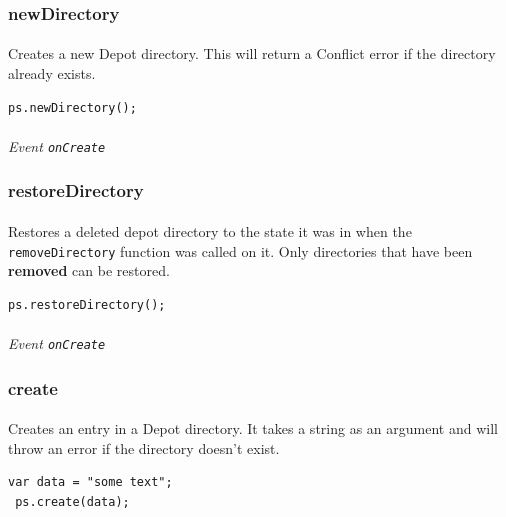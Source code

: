 \documentclass{report}
\begin{document}
\subsubsection{newDirectory}
\paragraph{}
Creates a new Depot directory. This will return a Conflict error
if the directory already exists.

\begin{Verbatim}[frame=single]
 ps.newDirectory();
\end{Verbatim}

\paragraph{}
\textit{Event \texttt{onCreate}}

\subsubsection{restoreDirectory}
\paragraph{}
Restores a deleted depot directory to the state it was in when the
\texttt{removeDirectory} function was called on it. Only directories
that have been \textbf{removed} can be restored. 

\begin{Verbatim}[frame=single]
 ps.restoreDirectory();
\end{Verbatim}

\paragraph{}
\textit{Event \texttt{onCreate}}


\subsubsection{create}
\paragraph{}
Creates an entry in a Depot directory. It takes a string as an
argument and will throw an error if the directory doesn't exist.

\begin{Verbatim}[frame=single]
 var data = "some text";
 ps.create(data);
\end{Verbatim}
\end{document}
